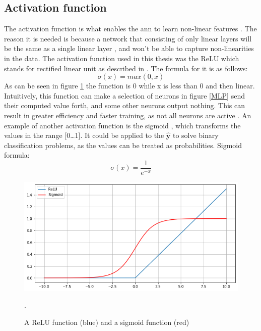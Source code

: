     \subsection{Activation function} \label{activation function}
        The activation function is what enables the \gls{ann} to learn non-linear features \cite{razavi2021deep_exp_per}. The reason it is needed is because a network that consisting of only linear layers will be the same as a single linear layer \cite{razavi2021deep_exp_per}, and won't be able to capture non-linearities in the data. The activation function used in this thesis was the ReLU which stands for rectified linear unit as described in \cite{sharma2019new_activation_func}. The formula for it is as follows:
            \begin{equation} \label{relu_eq}
                \sigma(x) = max(0,x)
            \end{equation}
        As can be seen in figure \ref{activation_fig} the function is 0 while x is less than 0 and then linear. Intuitively, this function can make a selection of neurons in figure \ref{MLP} send their computed value forth, and some  other neurons output nothing. This can result in greater efficiency and faster training, as not all neurons are active \cite{sharma2019new_activation_func}. An example of another activation function is the sigmoid \cite{sharma2019new_activation_func}, which transforms the values in the range [0…1]. It could be applied to the $\hat{\textbf{y}}$ to solve binary classification problems, as the values can be treated as probabilities. Sigmoid formula:
            \begin{equation} \label{sigmoid_eq}
                \sigma(x) = \dfrac{1}{e^{-x}} 
            \end{equation}
            
            \begin{figure}[H]
                \centering
                \includegraphics[scale=0.5]{figures/activation.png}
                \caption[ReLu and sigmoid]{A ReLU function (blue) and a sigmoid function (red)}.
              	\medskip 
                \label{activation_fig}
            \end{figure}
            
